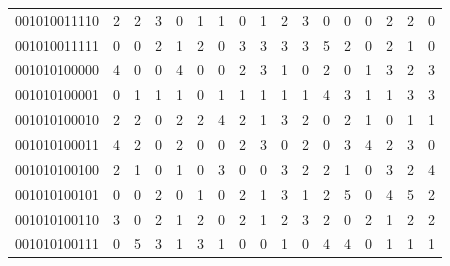 \documentclass[10pt,a4paper]{article}
\begin{document}
\begin{longtable}{ |c|c|c|c|c|c|c|c|c|c|c|c|c|c|c|c|c| }
    001010011110              & 2                            & 2                                & 3                            & 0                              & 1   & 1   & 0   & 1   & 2   & 3   & 0   & 0   & 0   & 2   & 2   & 0   \\
    001010011111              & 0                            & 0                                & 2                            & 1                              & 2   & 0   & 3   & 3   & 3   & 3   & 5   & 2   & 0   & 2   & 1   & 0   \\
    001010100000              & 4                            & 0                                & 0                            & 4                              & 0   & 0   & 2   & 3   & 1   & 0   & 2   & 0   & 1   & 3   & 2   & 3   \\
    001010100001              & 0                            & 1                                & 1                            & 1                              & 0   & 1   & 1   & 1   & 1   & 1   & 4   & 3   & 1   & 1   & 3   & 3   \\
    001010100010              & 2                            & 2                                & 0                            & 2                              & 2   & 4   & 2   & 1   & 3   & 2   & 0   & 2   & 1   & 0   & 1   & 1   \\
    001010100011              & 4                            & 2                                & 0                            & 2                              & 0   & 0   & 2   & 3   & 0   & 2   & 0   & 3   & 4   & 2   & 3   & 0   \\
    001010100100              & 2                            & 1                                & 0                            & 1                              & 0   & 3   & 0   & 0   & 3   & 2   & 2   & 1   & 0   & 3   & 2   & 4   \\
    001010100101              & 0                            & 0                                & 2                            & 0                              & 1   & 0   & 2   & 1   & 3   & 1   & 2   & 5   & 0   & 4   & 5   & 2   \\
    001010100110              & 3                            & 0                                & 2                            & 1                              & 2   & 0   & 2   & 1   & 2   & 3   & 2   & 0   & 2   & 1   & 2   & 2   \\
    001010100111              & 0                            & 5                                & 3                            & 1                              & 3   & 1   & 0   & 0   & 1   & 0   & 4   & 4   & 0   & 1   & 1   & 1   \\

\end{longtable}
\end{document}
